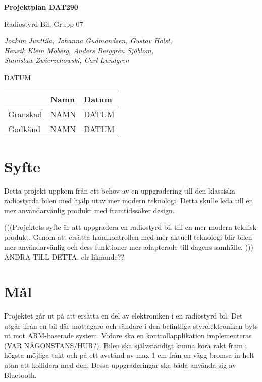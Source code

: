 \documentclass[a4paper]{article}
\begin{document}
\begin{titlepage}
\centering
{\bfseries\huge Projektplan DAT290}

\vspace{10mm}

{\Large Radiostyrd Bil, Grupp 07}

\vspace{20mm}

{\Large \itshape{Joakim Junttila, Johanna Gudmandsen, Gustav Holst,\\Henrik Klein Moberg, Anders Berggren Sjöblom, \\[1mm] Stanislaw Zwierzchowski, Carl Lundgren}}

\vspace{10mm}

{DATUM}


\normalsize{
\begin{table}[b]
\centering
\begin{tabular}{|l|l|l|}  \hline
          & \bf Namn & \bf Datum   \\ \hline \hline
 Granskad & NAMN     & DATUM        \\ \hline
 Godkänd  & NAMN     & DATUM         \\ \hline
  \end{tabular}  
  \end{table}}

\end{titlepage}
\newpage
\tableofcontents
\newpage


\section{Syfte}
Detta projekt uppkom från ett behov av en uppgradering till den klassiska radiostyrda bilen med hjälp utav mer modern teknologi. Detta skulle leda till en mer användarvänlig produkt med framtidssäker design.

\vspace{5mm}
(((Projektets syfte är att uppgradera en radiostyrd bil till en mer modern teknisk produkt. Genom att ersätta handkontrollen med mer aktuell teknologi blir bilen mer användarvänlig och dess funktioner mer adapterade till dagens samhälle. ))) ÄNDRA TILL DETTA, elr liknande??

\section{Mål}
Projektet går ut på att ersätta en del av elektroniken i en radiostyrd bil. Det utgår ifrån en bil där mottagare och sändare i den befintliga styrelektroniken byts ut mot ARM-baserade system. Vidare ska en kontrollapplikation implementeras (VAR NÅGONSTANS/HUR?). Bilen ska självständigt kunna köra rakt fram i högsta möjliga takt och på ett avstånd av max 1 cm från en vägg bromsa in helt utan att kollidera med den. Dessa uppgraderingar ska båda använda sig av Bluetooth. 
\end{document}
